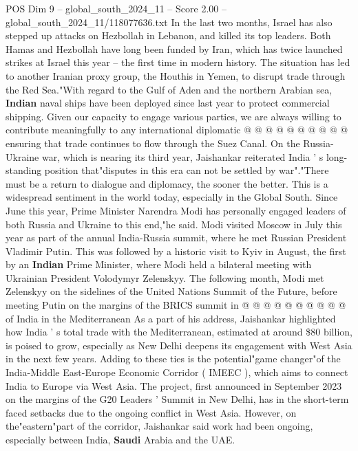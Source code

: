 \begin{textsample}{POS Dim 9 – global\_south\_2024\_11 – Score 2.00 – global\_south\_2024\_11/118077636.txt}
In the last two months, Israel has also stepped up attacks on Hezbollah in Lebanon, and killed its top leaders.
Both Hamas and Hezbollah have long been funded by Iran, which has twice launched strikes at Israel this year -- the first time in modern history.
The situation has led to another Iranian proxy group, the Houthis in Yemen, to disrupt trade through the Red Sea."With regard to the Gulf of Aden and the northern Arabian sea, \textbf{Indian} naval ships have been deployed since last year to protect commercial shipping.
Given our capacity to engage various parties, we are always willing to contribute meaningfully to any international diplomatic @ @ @ @ @ @ @ @ @ @ ensuring that trade continues to flow through the Suez Canal.
On the Russia-Ukraine war, which is nearing its third year, Jaishankar reiterated India ' s long-standing position that"disputes in this era can not be settled by war"."There must be a return to dialogue and diplomacy, the sooner the better.
This is a widespread sentiment in the world today, especially in the Global South.
Since June this year, Prime Minister Narendra Modi has personally engaged leaders of both Russia and Ukraine to this end,"he said.
Modi visited Moscow in July this year as part of the annual India-Russia summit, where he met Russian President Vladimir Putin.
This was followed by a historic visit to Kyiv in August, the first by an \textbf{Indian} Prime Minister, where Modi held a bilateral meeting with Ukrainian President Volodymyr Zelenskyy.
The following month, Modi met Zelenskyy on the sidelines of the United Nations Summit of the Future, before meeting Putin on the margins of the BRICS summit in @ @ @ @ @ @ @ @ @ @ of India in the Mediterranean As a part of his address, Jaishankar highlighted how India ' s total trade with the Mediterranean, estimated at around \$80 billion, is poised to grow, especially as New Delhi deepens its engagement with West Asia in the next few years.
Adding to these ties is the potential"game changer"of the India-Middle East-Europe Economic Corridor ( IMEEC ), which aims to connect India to Europe via West Asia.
The project, first announced in September 2023 on the margins of the G20 Leaders ' Summit in New Delhi, has in the short-term faced setbacks due to the ongoing conflict in West Asia.
However, on the"eastern"part of the corridor, Jaishankar said work had been ongoing, especially between India, \textbf{Saudi} Arabia and the UAE.

\end{textsample}
